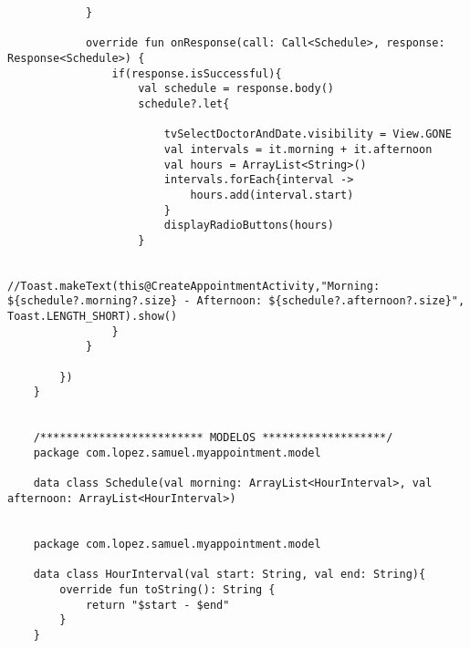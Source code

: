 \documentclass[a4paper]{article}
\begin{document}
\begin{lstlisting}
			}
			
			override fun onResponse(call: Call<Schedule>, response: Response<Schedule>) {
				if(response.isSuccessful){
					val schedule = response.body()
					schedule?.let{
						
						tvSelectDoctorAndDate.visibility = View.GONE
						val intervals = it.morning + it.afternoon
						val hours = ArrayList<String>()
						intervals.forEach{interval ->
							hours.add(interval.start)
						}
						displayRadioButtons(hours)
					}
					
					//Toast.makeText(this@CreateAppointmentActivity,"Morning: ${schedule?.morning?.size} - Afternoon: ${schedule?.afternoon?.size}", Toast.LENGTH_SHORT).show()
				}
			}
			
		})
	}		


	/************************* MODELOS *******************/
	package com.lopez.samuel.myappointment.model
	
	data class Schedule(val morning: ArrayList<HourInterval>, val afternoon: ArrayList<HourInterval>)
	
	
	package com.lopez.samuel.myappointment.model
	
	data class HourInterval(val start: String, val end: String){
		override fun toString(): String {
			return "$start - $end"
		}
	}
	\end{lstlisting}
	
	
	
	
	
	
	
\end{document}
